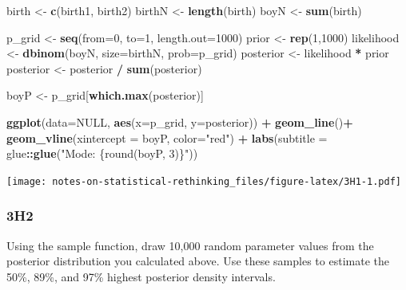 \documentclass[
]{book}
\newenvironment{Shaded}{\begin{snugshade}}{\end{snugshade}}
\newcommand{\DataTypeTok}[1]{\textcolor[rgb]{0.13,0.29,0.53}{#1}}
\newcommand{\DecValTok}[1]{\textcolor[rgb]{0.00,0.00,0.81}{#1}}
\newcommand{\KeywordTok}[1]{\textcolor[rgb]{0.13,0.29,0.53}{\textbf{#1}}}
\newcommand{\NormalTok}[1]{#1}
\newcommand{\OperatorTok}[1]{\textcolor[rgb]{0.81,0.36,0.00}{\textbf{#1}}}
\newcommand{\OtherTok}[1]{\textcolor[rgb]{0.56,0.35,0.01}{#1}}
\newcommand{\StringTok}[1]{\textcolor[rgb]{0.31,0.60,0.02}{#1}}
\begin{document}
\begin{Shaded}
\begin{Highlighting}[]
\NormalTok{birth \textless{}{-}}\StringTok{ }\KeywordTok{c}\NormalTok{(birth1, birth2)}
\NormalTok{birthN \textless{}{-}}\StringTok{ }\KeywordTok{length}\NormalTok{(birth)}
\NormalTok{boyN \textless{}{-}}\StringTok{ }\KeywordTok{sum}\NormalTok{(birth)}

\NormalTok{p\_grid \textless{}{-}}\StringTok{ }\KeywordTok{seq}\NormalTok{(}\DataTypeTok{from=}\DecValTok{0}\NormalTok{, }\DataTypeTok{to=}\DecValTok{1}\NormalTok{, }\DataTypeTok{length.out=}\DecValTok{1000}\NormalTok{)}
\NormalTok{prior \textless{}{-}}\StringTok{ }\KeywordTok{rep}\NormalTok{(}\DecValTok{1}\NormalTok{,}\DecValTok{1000}\NormalTok{)}
\NormalTok{likelihood \textless{}{-}}\StringTok{ }\KeywordTok{dbinom}\NormalTok{(boyN, }\DataTypeTok{size=}\NormalTok{birthN, }\DataTypeTok{prob=}\NormalTok{p\_grid)}
\NormalTok{posterior \textless{}{-}}\StringTok{ }\NormalTok{likelihood }\OperatorTok{*}\StringTok{ }\NormalTok{prior}
\NormalTok{posterior \textless{}{-}}\StringTok{ }\NormalTok{posterior }\OperatorTok{/}\StringTok{ }\KeywordTok{sum}\NormalTok{(posterior)}

\NormalTok{boyP \textless{}{-}}\StringTok{ }\NormalTok{p\_grid[}\KeywordTok{which.max}\NormalTok{(posterior)]}

\KeywordTok{ggplot}\NormalTok{(}\DataTypeTok{data=}\OtherTok{NULL}\NormalTok{, }\KeywordTok{aes}\NormalTok{(}\DataTypeTok{x=}\NormalTok{p\_grid, }\DataTypeTok{y=}\NormalTok{posterior)) }\OperatorTok{+}\StringTok{ }
\StringTok{  }\KeywordTok{geom\_line}\NormalTok{()}\OperatorTok{+}
\StringTok{  }\KeywordTok{geom\_vline}\NormalTok{(}\DataTypeTok{xintercept =}\NormalTok{ boyP, }\DataTypeTok{color=}\StringTok{"red"}\NormalTok{) }\OperatorTok{+}\StringTok{ }
\StringTok{  }\KeywordTok{labs}\NormalTok{(}\DataTypeTok{subtitle =}\NormalTok{ glue}\OperatorTok{::}\KeywordTok{glue}\NormalTok{(}\StringTok{"Mode: \{round(boyP, 3)\}"}\NormalTok{))}
\end{Highlighting}
\end{Shaded}

\texttt{[image: notes-on-statistical-rethinking\_files/figure-latex/3H1-1.pdf]}

\hypertarget{h2-1}{%
\subsubsection*{3H2}\label{h2-1}}

Using the sample function, draw 10,000 random parameter values from the posterior distribution you calculated above. Use these samples to estimate the 50\%, 89\%, and 97\% highest posterior density intervals.
\end{document}
